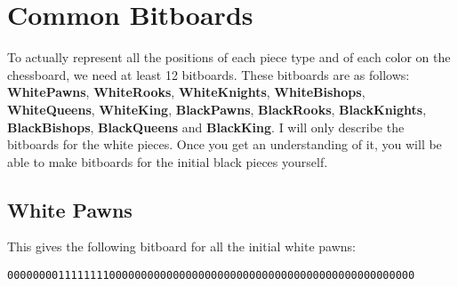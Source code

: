 \section{Common Bitboards}
To actually represent all the positions of each piece type and of each color on the chessboard, we need at least 12 bitboards. 
These bitboards are as follows:	\textbf{WhitePawns}, \textbf{WhiteRooks}, \textbf{WhiteKnights}, \textbf{WhiteBishops}, \textbf{WhiteQueens}, \textbf{WhiteKing}, \textbf{BlackPawns}, \textbf{BlackRooks}, \textbf{BlackKnights}, \textbf{BlackBishops}, \textbf{BlackQueens} and \textbf{BlackKing}.
I will only describe the bitboards for the white pieces.
Once you get an understanding of it, you will be able to make bitboards for the initial black pieces yourself.

\subsection{White Pawns}
%
\begin{figure}[H]
	\centering
\end{figure}
%
This gives the following bitboard for all the initial white pawns:
%
\begin{center}
	\texttt{0000000011111111000000000000000000000000000000000000000000000000}
\end{center}
%


